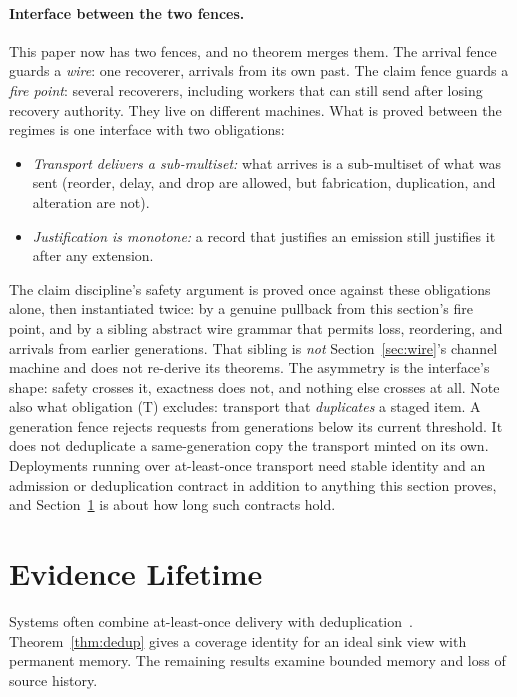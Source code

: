 \documentclass[sigplan,10pt]{acmart}
\theoremstyle{plain}
\theoremstyle{definition}
\begin{document}
\paragraph{Interface between the two fences.}
This paper now has two fences, and no theorem merges them. The arrival
fence guards a \emph{wire}: one recoverer, arrivals from its own past.
The claim fence guards a \emph{fire point}: several recoverers, including workers
that can still send after losing recovery authority. They live on different machines. What is
proved between the regimes is one interface with two obligations:
\begin{itemize}
\item[(T)] \emph{Transport delivers a sub-multiset:} what arrives is a
  sub-multiset of what was sent (reorder, delay, and drop are
  allowed, but fabrication, duplication, and alteration are not).
\item[(J)] \emph{Justification is monotone:} a record that justifies
  an emission still justifies it after any extension.
\end{itemize}
The claim discipline's safety argument is proved once against these
obligations alone, then instantiated twice: by a genuine pullback from
this section's fire point, and by a sibling abstract wire grammar that
permits loss, reordering, and arrivals from earlier generations. That
sibling is \emph{not} Section~\ref{sec:wire}'s channel machine and does
not re-derive its theorems. The asymmetry is the interface's shape:
safety crosses it, exactness does not, and nothing else crosses at
all. Note also what obligation (T) excludes: transport that
\emph{duplicates} a staged item. A generation fence rejects requests from
generations below its current threshold. It does not deduplicate a same-generation copy the
transport minted on its own. Deployments running over at-least-once
transport need stable identity and an admission or deduplication
contract in addition to anything this section proves, and
Section~\ref{sec:memory} is about how long such contracts hold.

\section{Evidence Lifetime}\label{sec:memory}

Systems often combine at-least-once delivery with
deduplication~\cite{treat,ddia}. Theorem~\ref{thm:dedup} gives a
coverage identity for an ideal sink view with permanent memory. The
remaining results examine bounded memory and loss of source history.
\end{document}
